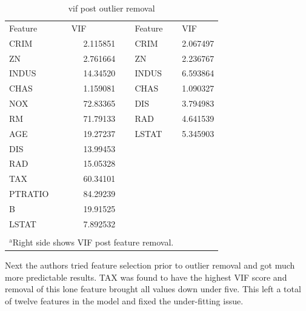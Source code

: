 \documentclass[conference, 11pt]{IEEEtran}
\begin{document}
\begin{table}[htbp]
  \centering
  \caption{vif post outlier removal}
    \begin{tabular}{rrrrr}
    \multicolumn{1}{l}{Feature} & \multicolumn{1}{l}{VIF} &       & \multicolumn{1}{l}{Feature} & \multicolumn{1}{l}{VIF} \\
    \cmidrule{1-2}\cmidrule{4-5}
    \multicolumn{1}{l}{CRIM} & 2.115851 &       & \multicolumn{1}{l}{CRIM} & 2.067497 \\
    \multicolumn{1}{l}{ZN} & 2.761664 &       & \multicolumn{1}{l}{ZN} & 2.236767 \\
    \multicolumn{1}{l}{INDUS} & 14.34520 &       & \multicolumn{1}{l}{INDUS} & 6.593864 \\
    \multicolumn{1}{l}{CHAS} & 1.159081 &       & \multicolumn{1}{l}{CHAS} & 1.090327 \\
    \multicolumn{1}{l}{NOX} & 72.83365 &       & \multicolumn{1}{l}{DIS} & 3.794983 \\
    \multicolumn{1}{l}{RM} & 71.79133 &       & \multicolumn{1}{l}{RAD} & 4.641539 \\
    \multicolumn{1}{l}{AGE} & 19.27237 &       & \multicolumn{1}{l}{LSTAT} & 5.345903 \\
    \multicolumn{1}{l}{DIS} & 13.99453 &       &       &  \\
    \multicolumn{1}{l}{RAD} & 15.05328 &       &       &  \\
    \multicolumn{1}{l}{TAX} & 60.34101 &       &       &  \\
    \multicolumn{1}{l}{PTRATIO} & 84.29239 &       &       &  \\
    \multicolumn{1}{l}{B} & 19.91525 &       &       &  \\
    \multicolumn{1}{l}{LSTAT} & 7.892532 &       &       &  \\
          &       &       &       &  \\
    \multicolumn{4}{l}{$^{\mathrm{a}}$Right side shows VIF post feature removal.}
    \end{tabular}%
  \label{table:vif1}%
\end{table}%

Next the authors tried feature selection prior to outlier removal and got much more predictable results. TAX was found to have the highest VIF score and removal of this lone feature brought all values down under five. This left a total of twelve features in the model and fixed the under-fitting issue.
\end{document}
